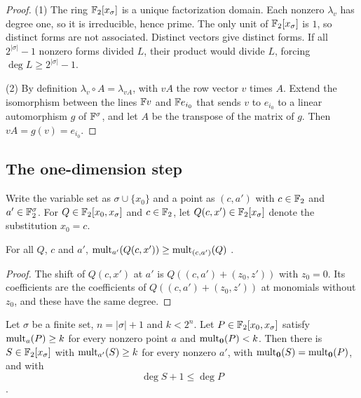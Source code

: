 \begin{proof}
(1) The ring \(\mathbb F_2[x_\sigma]\) is a unique factorization domain. Each nonzero
\(\lambda_v\) has degree one, so it is irreducible, hence prime. The only unit of \(\mathbb F_2[x_\sigma]\) is \(1\), so
distinct forms are not associated. Distinct vectors give distinct forms. If all
\(2^{|\sigma|}-1\) nonzero forms divided \(L\), their product would divide \(L\),
forcing \(\deg L\ge2^{|\sigma|}-1\).

(2) By definition \(\lambda_v\circ A=\lambda_{vA}\), with \(vA\) the row vector \(v\)
times \(A\). Extend the isomorphism between the lines \(\mathbb F v\) and \(\mathbb F e_{i_0}\)
that sends \(v\) to \(e_{i_0}\) to a linear automorphism \(g\) of \(\mathbb F^\sigma\), and
let \(A\) be the transpose of the matrix of \(g\). Then \(vA=g(v)=e_{i_0}\).
\end{proof}

\subsection{The one-dimension step}

Write the variable set as \(\sigma\cup\{x_0\}\) and a point as \((c,a')\) with
\(c\in\mathbb F_2\) and \(a'\in\mathbb F_2^\sigma\). For \(Q\in\mathbb F_2[x_0,x_\sigma]\) and \(c\in\mathbb F_2\), let
\(Q(c,x')\in\mathbb F_2[x_\sigma]\) denote the substitution \(x_0=c\).

\begin{lemma}\label{lem:restrict}
For all \(Q\), \(c\) and \(a'\), \(\operatorname{mult}_{a'}(Q(c,x'))\ge\operatorname{mult}_{(c,a')}(Q)\)
.
\end{lemma}

\begin{proof}
The shift of \(Q(c,x')\) at \(a'\) is \(Q((c,a')+(z_0,z'))\) with \(z_0=0\). Its
coefficients are the coefficients of \(Q((c,a')+(z_0,z'))\) at monomials without
\(z_0\), and these have the same degree.
\end{proof}

\begin{theorem}\label{thm:step}
Let \(\sigma\) be a finite set, \(n=|\sigma|+1\) and \(k<2^n\). Let
\(P\in\mathbb F_2[x_0,x_\sigma]\) satisfy \(\operatorname{mult}_a(P)\ge k\) for every nonzero point \(a\)
and \(\operatorname{mult}_{\mathbf 0}(P)<k\). Then there is \(S\in\mathbb F_2[x_\sigma]\) with
\(\operatorname{mult}_{a'}(S)\ge k\) for every nonzero \(a'\), with
\(\operatorname{mult}_{\mathbf 0}(S)=\operatorname{mult}_{\mathbf 0}(P)\), and with
\[
 \deg S+1\le\deg P
\]
.
\end{theorem}


